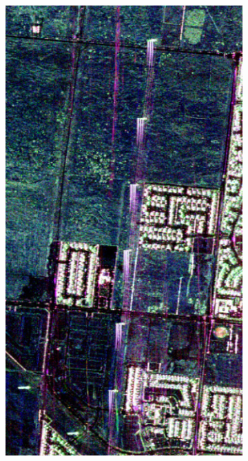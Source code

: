 \begin{figure}[t]
\centering
\begin{subfigure}[b]{0.23\columnwidth}
		\includegraphics[width=\textwidth]{Figures/CD/A2_2009}
		\caption{}
		\label{fig:3_a}
\end{subfigure}
\hspace{0.01pt}
\begin{subfigure}[b]{0.23\columnwidth}

\end{subfigure}
\end{figure}
